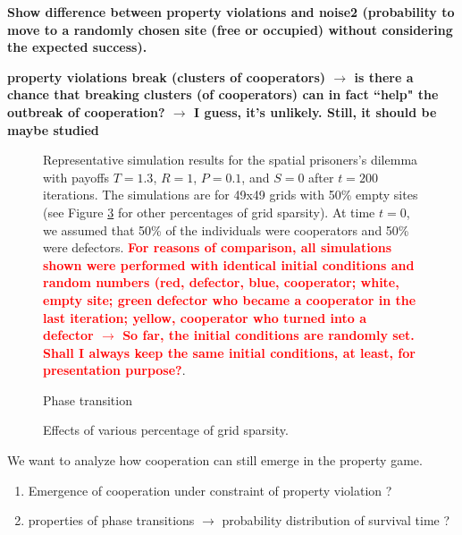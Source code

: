 {\bf Show difference between property violations and noise2 (probability to move to a randomly chosen site (free or occupied) without considering the expected success).}

{\bf property violations break (clusters of cooperators) $\rightarrow$ is there a chance that breaking clusters (of cooperators) can in fact ``help" the outbreak of cooperation? $\rightarrow$ I guess, it's unlikely. Still, it should be maybe studied}

\begin{figure}[h]
\begin{center}
\caption{Representative simulation results for the spatial prisoners's dilemma with payoffs $T=1.3$, $R=1$, $P=0.1$, and $S=0$ after $t=200$ iterations. The simulations are for 49x49 grids with 50\% empty sites (see Figure \ref{perc_filled} for other percentages of grid sparsity). At time $t=0$, we assumed that 50\% of the individuals were cooperators and 50\% were defectors. \textcolor{red}{\bf For reasons of comparison, all simulations shown were performed with identical initial conditions and random numbers (red, defector, blue, cooperator; white, empty site; green defector who became a cooperator in the last iteration; yellow, cooperator who turned into a defector $\rightarrow$ So far, the initial conditions are randomly set. Shall I always keep the same initial conditions, at least, for presentation purpose?}.}
\label{configurations}
\end{center}
\end{figure}


\begin{figure}[h]
\begin{center}
\caption{Phase transition}
\label{phase_transition}
\end{center}
\end{figure}


\begin{figure}[h]
\begin{center}
\caption{Effects of various percentage of grid sparsity.}
\label{perc_filled}
\end{center}
\end{figure}

We want to analyze how cooperation can still emerge in the property game.

\begin{enumerate}
  \item Emergence of cooperation under constraint of property violation ?
  \item properties of phase transitions $\rightarrow$ probability distribution of survival time ?
\end{enumerate}



